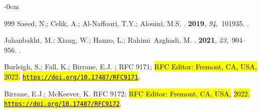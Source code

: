 \documentclass[blockchains,review,accept,moreauthors]{Definitions/mdpi}
\begin{document}
\begin{adjustwidth}{-\extralength}{0cm}
\begin{thebibliography}{999}
Saeed, N.; Celik, A.; Al-Naffouri, T.Y.; Alouini, M.S.
.
 {\bf 2019}, {\em 94},~101935.
.

Jahanbakht, M.; Xiang, W.; Hanzo, L.; Rahimi~Azghadi, M.
.
 {\bf 2021}, {\em
  23},~904--956.
.

Burleigh, S.; Fall, K.; Birrane, E.J.
; RFC 9171; \hl{RFC Editor: Fremont, CA, USA,} \hl{2022.} %
\newblock \href{https://doi.org/10.17487/RFC9171}{\hl{\mbox{\nolinkurl{https://doi.org/}}}}\allowbreak\href{https://doi.org/10.17487/RFC9171}{\hl{\mbox{\nolinkurl{10.17487/}}}}\allowbreak\href{https://doi.org/10.17487/RFC9171}{\hl{\mbox{\nolinkurl{RFC9171}}}}.


Birrane, E.J.; McKeever, K.
 RFC 9172; \hl{RFC Editor: Fremont, CA, USA,} \hl{2022.} %
\newblock \href{https://doi.org/10.17487/RFC9172}{\hl{\mbox{\nolinkurl{https://doi.org/}}}}\allowbreak\href{https://doi.org/10.17487/RFC9172}{\hl{\mbox{\nolinkurl{10.17487/}}}}\allowbreak\href{https://doi.org/10.17487/RFC9172}{\hl{\mbox{\nolinkurl{RFC9172}}}}.




\end{thebibliography}
\end{adjustwidth}
\end{document}
